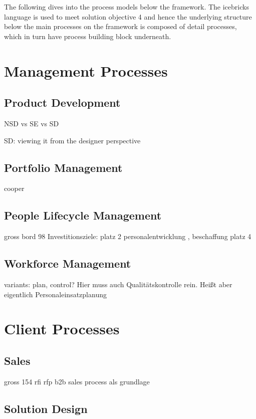 	 The following dives into the process models below the framework. The icebricks language is used to meet solution objective 4 and hence the underlying structure below the main processes on the framework is composed of detail processes, which in turn have process building block underneath. 
	 
	\section{Management Processes}
	\subsection{Product Development}
	
	NSD vs SE vs SD
	
	SD: viewing it from the designer perspective
	
	
	
	
	\subsection{Portfolio Management}
	
	cooper
	
	\subsection{People Lifecycle Management}
	gross bord 98
		Investitionsziele: platz 2 personalentwicklung \citep{ccnet2016}, beschaffung platz 4
	\subsection{Workforce Management}
	variants: plan, control?
	Hier muss auch Qualitätskontrolle rein. Heißt aber eigentlich Personaleinsatzplanung
	
	\section{Client Processes}
	\subsection{Sales}
	gross 154 rfi rfp
	b2b sales process als grundlage
	
	\subsection{Solution Design}
	
